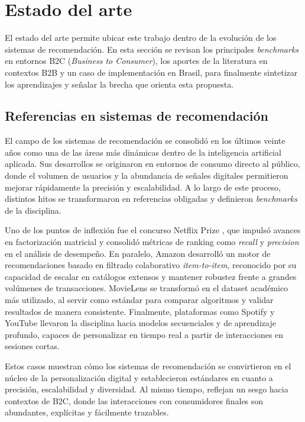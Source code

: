 \section{Estado del arte}

El estado del arte permite ubicar este trabajo dentro de la evolución de los sistemas de recomendación. En esta sección se revisan los principales \textit{benchmarks} en entornos B2C (\textit{Business to Consumer}), los aportes de la literatura en contextos B2B y un caso de implementación en Brasil, para finalmente sintetizar los aprendizajes y señalar la brecha que orienta esta propuesta.

\subsection{Referencias en sistemas de recomendación}

El campo de los sistemas de recomendación se consolidó en los últimos veinte años como una de las áreas más dinámicas dentro de la inteligencia artificial aplicada. Sus desarrollos se originaron en entornos de consumo directo al público, donde el volumen de usuarios y la abundancia de señales digitales permitieron mejorar rápidamente la precisión y escalabilidad. A lo largo de este proceso, distintos hitos se transformaron en referencias obligadas y definieron \textit{benchmarks} de la disciplina.

Uno de los puntos de inflexión fue el concurso Netflix Prize \cite{ARTICLE:NetflixPrize}, que impulsó avances en factorización matricial y consolidó métricas de ranking como \textit{recall} y \textit{precision} en el análisis de desempeño. En paralelo, Amazon desarrolló un motor de recomendaciones basado en filtrado colaborativo \textit{item-to-item}, reconocido por su capacidad de escalar en catálogos extensos y mantener robustez frente a grandes volúmenes de transacciones. MovieLens \cite{ARTICLE:MovieLens} se transformó en el dataset académico más utilizado, al servir como estándar para comparar algoritmos y validar resultados de manera consistente. Finalmente, plataformas como Spotify y YouTube llevaron la disciplina hacia modelos secuenciales y de aprendizaje profundo, capaces de personalizar en tiempo real a partir de interacciones en sesiones cortas.

Estos casos muestran cómo los sistemas de recomendación se convirtieron en el núcleo de la personalización digital y establecieron estándares en cuanto a precisión, escalabilidad y diversidad. Al mismo tiempo, reflejan un sesgo hacia contextos de  B2C, donde las interacciones con consumidores finales son abundantes, explícitas y fácilmente trazables.

